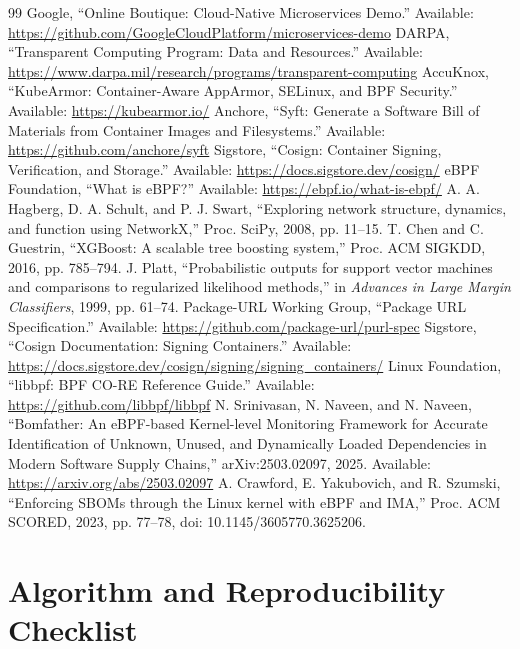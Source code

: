 \documentclass[12pt,a4paper,oneside]{report}
\begin{document}
\begin{thebibliography}{99}
 Google, ``Online Boutique: Cloud-Native Microservices Demo.'' Available: \url{https://github.com/GoogleCloudPlatform/microservices-demo}
 DARPA, ``Transparent Computing Program: Data and Resources.'' Available: \url{https://www.darpa.mil/research/programs/transparent-computing}
 AccuKnox, ``KubeArmor: Container-Aware AppArmor, SELinux, and BPF Security.'' Available: \url{https://kubearmor.io/}
 Anchore, ``Syft: Generate a Software Bill of Materials from Container Images and Filesystems.'' Available: \url{https://github.com/anchore/syft}
 Sigstore, ``Cosign: Container Signing, Verification, and Storage.'' Available: \url{https://docs.sigstore.dev/cosign/}
 eBPF Foundation, ``What is eBPF?'' Available: \url{https://ebpf.io/what-is-ebpf/}
 A. A. Hagberg, D. A. Schult, and P. J. Swart, ``Exploring network structure, dynamics, and function using NetworkX,'' Proc. SciPy, 2008, pp. 11--15.
 T. Chen and C. Guestrin, ``XGBoost: A scalable tree boosting system,'' Proc. ACM SIGKDD, 2016, pp. 785--794.
 J. Platt, ``Probabilistic outputs for support vector machines and comparisons to regularized likelihood methods,'' in \emph{Advances in Large Margin Classifiers}, 1999, pp. 61--74.
 Package-URL Working Group, ``Package URL Specification.'' Available: \url{https://github.com/package-url/purl-spec}
 Sigstore, ``Cosign Documentation: Signing Containers.'' Available: \url{https://docs.sigstore.dev/cosign/signing/signing_containers/}
 Linux Foundation, ``libbpf: BPF CO-RE Reference Guide.'' Available: \url{https://github.com/libbpf/libbpf}
 N. Srinivasan, N. Naveen, and N. Naveen, ``Bomfather: An eBPF-based Kernel-level Monitoring Framework for Accurate Identification of Unknown, Unused, and Dynamically Loaded Dependencies in Modern Software Supply Chains,'' arXiv:2503.02097, 2025. Available: \url{https://arxiv.org/abs/2503.02097}
 A. Crawford, E. Yakubovich, and R. Szumski, ``Enforcing SBOMs through the Linux kernel with eBPF and IMA,'' Proc. ACM SCORED, 2023, pp. 77--78, doi: 10.1145/3605770.3625206.
\end{thebibliography}
\appendix
\chapter{Algorithm and Reproducibility Checklist}
\end{document}

